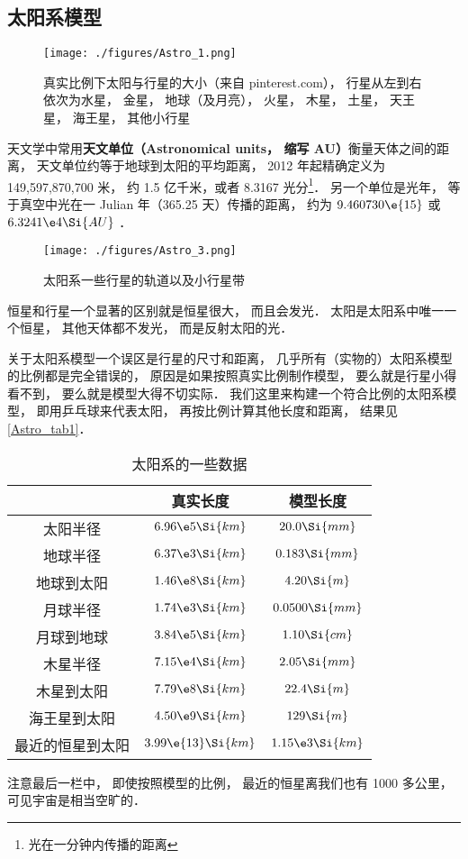 
\subsection{太阳系模型}

\begin{figure}[ht]
\centering
\texttt{[image: ./figures/Astro\_1.png]}
\caption{真实比例下太阳与行星的大小（来自 pinterest.com）， 行星从左到右依次为水星， 金星， 地球（及月亮）， 火星， 木星， 土星， 天王星， 海王星， 其他小行星} \label{Astro_fig1}
\end{figure}

天文学中常用\textbf{天文单位（Astronomical units， 缩写 AU）}衡量天体之间的距离， 天文单位约等于地球到太阳的平均距离， 2012 年起精确定义为 149,597,870,700 米， 约 1.5 亿千米，或者 8.3167 光分\footnote{光在一分钟内传播的距离}． 另一个单位是光年， 等于真空中光在一 Julian 年（365.25 天）传播的距离， 约为 $9.460730\e{15}$ 或 $6.3241\e4\Si{AU}$ ．

\begin{figure}[ht]
\centering
\texttt{[image: ./figures/Astro\_3.png]}
\caption{太阳系一些行星的轨道以及小行星带} \label{Astro_fig3}
\end{figure}

恒星和行星一个显著的区别就是恒星很大， 而且会发光． 太阳是太阳系中唯一一个恒星， 其他天体都不发光， 而是反射太阳的光．

关于太阳系模型一个误区是行星的尺寸和距离， 几乎所有（实物的）太阳系模型的比例都是完全错误的， 原因是如果按照真实比例制作模型， 要么就是行星小得看不到， 要么就是模型大得不切实际． 我们这里来构建一个符合比例的太阳系模型， 即用乒乓球来代表太阳， 再按比例计算其他长度和距离， 结果见\autoref{Astro_tab1}．

\begin{table}[ht]
\centering
\caption{太阳系的一些数据}\label{Astro_tab1}
\begin{tabular}{|c|c|c|}
\hline
 & 真实长度 & 模型长度 \\
\hline
太阳半径 & $6.96\e5 \Si{km}$ & $20.0 \Si{mm}$\\
\hline
地球半径 &  $6.37\e3 \Si{km}$ & $0.183 \Si{mm}$\\
\hline
地球到太阳  &  $1.46\e8 \Si{km}$ & $4.20 \Si{m}$\\
\hline
月球半径 & $1.74\e3 \Si{km}$ & $0.0500 \Si{mm}$\\
\hline
月球到地球 & $3.84\e5 \Si{km}$ &  $1.10 \Si{cm}$\\
\hline
木星半径 & $7.15\e4 \Si{km}$ & $2.05 \Si{mm}$\\
\hline
木星到太阳 & $7.79\e8 \Si{km}$ & $22.4 \Si{m}$\\
\hline
海王星到太阳 & $4.50\e9 \Si{km}$ & $129 \Si{m}$\\
\hline
最近的恒星到太阳 & $3.99\e{13} \Si{km}$ &  $1.15\e3 \Si{km}$\\
\hline
\end{tabular}
\end{table}
注意最后一栏中， 即使按照模型的比例， 最近的恒星离我们也有 1000 多公里， 可见宇宙是相当空旷的．

